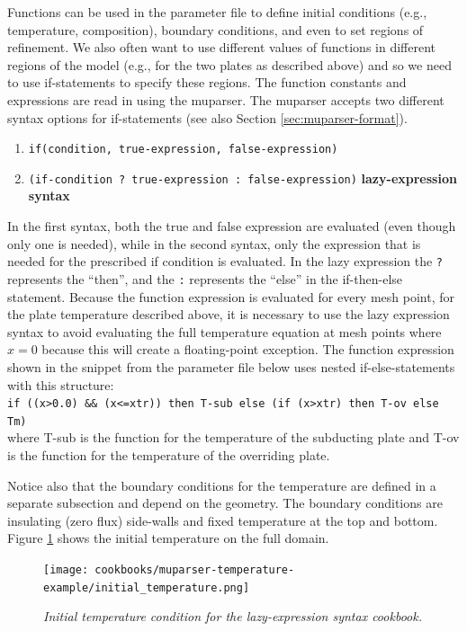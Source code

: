 \documentclass{article}
\begin{document}
Functions can be used in the parameter file to define initial conditions (e.g., temperature, composition), boundary conditions, and even to set regions of refinement. We also often want to use different values of functions in different regions of the model (e.g., for the two plates as described above) and so we need to use if-statements to specify these regions. The function constants and expressions are read in using the muparser. The muparser accepts two different syntax options for if-statements (see also Section \ref{sec:muparser-format}).
\begin{enumerate}
\item \texttt{if(condition, true-expression, false-expression)}
\item \texttt{(if-condition ?\ true-expression :\ false-expression)}  \textbf{lazy-expression syntax}
\end{enumerate}
In the first syntax, both the true and false expression are evaluated (even though only one is needed), while in the second  syntax, only the expression that is needed for the prescribed if condition is evaluated. In the lazy expression the \texttt{?} represents the ``then'', and the \texttt{:} represents the ``else'' in the if-then-else statement. Because the function expression is evaluated for every mesh point, for the plate temperature described above, it is necessary to use the lazy expression syntax to avoid evaluating the full temperature equation at mesh points where $x=0$ because this will create a floating-point exception.  The function expression shown in the snippet from the parameter file below uses nested if-else-statements with this structure:\\
\texttt{if ((x>0.0) \&\& (x<=xtr))  then T-sub else (if (x>xtr) then T-ov else Tm)}\\
where T-sub is the function for the temperature of the subducting plate and T-ov is the function for the temperature of the
overriding plate.

Notice also that the boundary conditions for the temperature are defined in a separate subsection and depend on the geometry.
The boundary conditions are insulating (zero flux) side-walls and fixed temperature at the top and bottom. Figure \ref{lazy-expression-tempic} shows the initial temperature on the full domain.
\begin{figure}
\centering
\texttt{[image: cookbooks/muparser-temperature-example/initial\_temperature.png]}
\caption{\it Initial temperature condition for the lazy-expression syntax cookbook. \label{lazy-expression-tempic}}
\end{figure}
\end{document}
